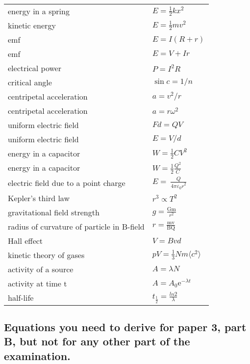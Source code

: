 \documentclass[main.tex]{subfiles}
\begin{document}
\renewcommand*{\arraystretch}{2}
\begin{longtable}{ll}
energy in a spring & $E = \frac{1}{2}kx^2$ \\
kinetic energy & $E = \frac{1}{2}mv^{2}$\\
emf & $E = I(R+r)$\\
emf & $E = V + Ir$\\
electrical power & $P = I^{2}R$\\
critical angle & $\sin{c} = 1/n$\\
centripetal acceleration & $a = v^{2}/r$\\
centripetal acceleration & $a = r\omega^2$\\
uniform electric field & $Fd = QV$\\
uniform electric field & $E = V/d$\\
energy in a capacitor & $W = \frac{1}{2}CV^2$\\
energy in a capacitor & $W = \frac{1}{2}\frac{Q^2}{C}$\\
electric field due to a point charge &
\(E = \ \frac{Q}{{4\pi\varepsilon_{0}r}^{2}}\)\\

Kepler's third law & $r^{3} \propto T^{2}$\\
gravitational field strength & \(g = \frac{\text{Gm}}{r^{2}}\)\\

radius of curvature of particle in B-field &
\(r = \frac{\text{mv}}{\text{BQ}}\) \\

Hall effect & $V = Bvd$\\

kinetic theory of gases & $pV = \frac{1}{3}Nm\langle c^2 \rangle$\\

activity of a source & $A = \lambda N$\\

activity at time t & $A = A_0\text{e}^{-\lambda t}$\\
half-life & \(t_{\frac{1}{2}} = \frac{ln2}{\lambda}\)\\
\end{longtable}


\subsection{Equations you need to derive for paper 3, part B, but not for any other part of the examination.}
\end{document}
